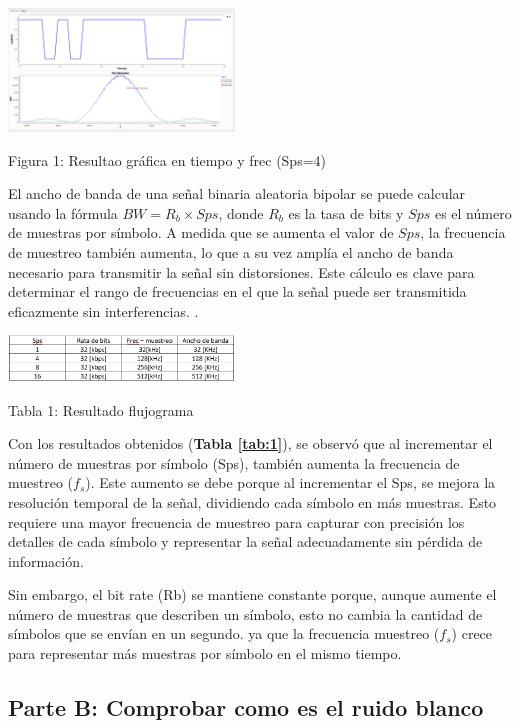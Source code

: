 \documentclass{journal}[IEEEtran, twocolumn]             %
\begin{document}
\begin{multicols}{2}
    \begin{center}
    \includegraphics[width=0.45\textwidth]{figs/F1.png}
    \caption{Figura 1: Resultao gráfica en tiempo y frec (Sps=4)}
    \label{fig:1}
    \end{center}
    
El ancho de banda de una señal binaria aleatoria bipolar se puede calcular usando la fórmula \( BW = R_b \times Sps \), donde \( R_b \) es la tasa de bits y \( Sps \) es el número de muestras por símbolo. A medida que se aumenta el valor de \( Sps \), la frecuencia de muestreo también aumenta, lo que a su vez amplía el ancho de banda necesario para transmitir la señal sin distorsiones. Este cálculo es clave para determinar el rango de frecuencias en el que la señal puede ser transmitida eficazmente sin interferencias. \cite{comu}.

    \begin{center}
    \includegraphics[width=0.45\textwidth]{figs/F2.png}
    \caption{Tabla 1: Resultado flujograma}
    \label{tab:1}
    \end{center}
    
Con los resultados obtenidos (\textbf{Tabla \ref{tab:1}}), se observó que al incrementar el número de muestras por símbolo (Sps), también aumenta la frecuencia de muestreo ($f_s$). Este aumento se debe porque al incrementar el Sps, se mejora la resolución temporal de la señal, dividiendo cada símbolo en más muestras. Esto requiere una mayor frecuencia de muestreo para capturar con precisión los detalles de cada símbolo y representar la señal adecuadamente sin pérdida de información. 

Sin embargo, el bit rate (Rb) se mantiene constante porque, aunque aumente el número de muestras que describen un símbolo, esto no cambia la cantidad de símbolos que se envían en un segundo. ya que la frecuencia muestreo ($f_s$) crece para representar más muestras por símbolo en el mismo tiempo.


\subsection{Parte B: Comprobar como es el ruido blanco}


\end{multicols}
\end{document}
